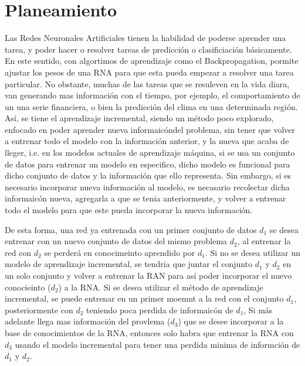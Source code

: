 \section{Planeamiento}

Las Redes Neuronales Artificiales tienen la habilidad de poderse aprender una tarea, y poder hacer o resolver tareas de predicción o clasificiación básicamente. En este sentido, con algortimos de aprendizaje como el Backpropagation, pormite ajustar los pesos de una RNA para que esta pueda empezar a resolver una tarea particular.  No obstante, muchas de las tareas que se resuleven en la vida diara, van generando mas información con el tiempo, por ejemplo, el comportamiento de un una serie financiera, o bien la predicción del clima en una determinada región. Así,  se tiene el aprendizaje incremental, siendo un método poco explorado,  enfocado en poder aprender nueva informaicóndel problema, sin tener que volver a entrenar todo el modelo con la información anterior, y la nueva que acaba de lleger, i.e.  en los modelos actuales de aprendizaje máquina, si se usa un conjunto de datos para entrenar un modelo en especifico, dicho modelo es funcional para dicho conjunto de datos y la información que ello representa. Sin embargo, si es necesario incorporar nueva información al modelo, es necasario recolectar dicha informaicón nueva, agregarla a que se tenia anteriormente, y volver a entrenar todo el modelo para que este pueda incorporar la nueva información.

De esta forma, una red ya entrenada con un primer conjunto de datos $d_{1}$ se desea entrenar con un nuevo conjunto de datos del mismo problema $d_{2}$, al entrenar la red con $d_{2}$ se perderá en conocimeinto aprendido por $d_{1}$.  Si no se desea utilizar un modelo de aprendizaje incremental, se tendria que juntar el conjunto $d_{1}$ y $d_{2}$ en un solo conjunto y volver a entrenar la RAN para así poder incorporar el nuevo conocieinto ($d_{2}$) a la RNA. Si se desea utilizar el método de aprendizaje incremental, se puede entrenar en un primer moemnt a la red con el conjunto $d_{1}$, posteriormente con $d_{2}$ teniendo poca perdida de informaicón de $d_{1}$, Si más adelante llega mas información del provlema ($d_{3}$) que se desee incorporar a la base de conocimientos de la RNA, entonces solo habra que entrenar la RNA con $d_{3}$ usando el modelo incremental para tener una perdida minima de informción de $d_{1}$ y $d_{2}$. 

